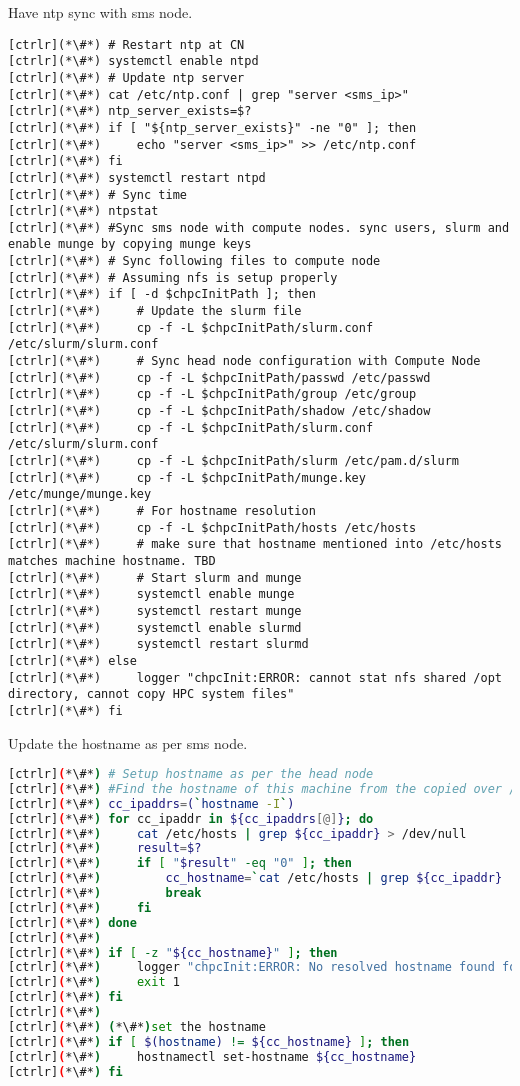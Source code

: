 Have ntp sync with sms node. 


\begin{lstlisting}
[ctrlr](*\#*) # Restart ntp at CN
[ctrlr](*\#*) systemctl enable ntpd
[ctrlr](*\#*) # Update ntp server
[ctrlr](*\#*) cat /etc/ntp.conf | grep "server <sms_ip>"
[ctrlr](*\#*) ntp_server_exists=$?
[ctrlr](*\#*) if [ "${ntp_server_exists}" -ne "0" ]; then
[ctrlr](*\#*)     echo "server <sms_ip>" >> /etc/ntp.conf
[ctrlr](*\#*) fi
[ctrlr](*\#*) systemctl restart ntpd
[ctrlr](*\#*) # Sync time
[ctrlr](*\#*) ntpstat
[ctrlr](*\#*) #Sync sms node with compute nodes. sync users, slurm and enable munge by copying munge keys
[ctrlr](*\#*) # Sync following files to compute node
[ctrlr](*\#*) # Assuming nfs is setup properly
[ctrlr](*\#*) if [ -d $chpcInitPath ]; then
[ctrlr](*\#*)     # Update the slurm file
[ctrlr](*\#*)     cp -f -L $chpcInitPath/slurm.conf /etc/slurm/slurm.conf
[ctrlr](*\#*)     # Sync head node configuration with Compute Node
[ctrlr](*\#*)     cp -f -L $chpcInitPath/passwd /etc/passwd
[ctrlr](*\#*)     cp -f -L $chpcInitPath/group /etc/group
[ctrlr](*\#*)     cp -f -L $chpcInitPath/shadow /etc/shadow
[ctrlr](*\#*)     cp -f -L $chpcInitPath/slurm.conf /etc/slurm/slurm.conf
[ctrlr](*\#*)     cp -f -L $chpcInitPath/slurm /etc/pam.d/slurm
[ctrlr](*\#*)     cp -f -L $chpcInitPath/munge.key /etc/munge/munge.key
[ctrlr](*\#*)     # For hostname resolution
[ctrlr](*\#*)     cp -f -L $chpcInitPath/hosts /etc/hosts
[ctrlr](*\#*)     # make sure that hostname mentioned into /etc/hosts matches machine hostname. TBD
[ctrlr](*\#*)     # Start slurm and munge 
[ctrlr](*\#*)     systemctl enable munge
[ctrlr](*\#*)     systemctl restart munge
[ctrlr](*\#*)     systemctl enable slurmd
[ctrlr](*\#*)     systemctl restart slurmd
[ctrlr](*\#*) else
[ctrlr](*\#*)     logger "chpcInit:ERROR: cannot stat nfs shared /opt directory, cannot copy HPC system files"
[ctrlr](*\#*) fi
\end{lstlisting}
Update the hostname as per sms node.


\begin{lstlisting}[language=bash,keywords={}]
[ctrlr](*\#*) # Setup hostname as per the head node
[ctrlr](*\#*) #Find the hostname of this machine from the copied over /etc/hosts file
[ctrlr](*\#*) cc_ipaddrs=(`hostname -I`)
[ctrlr](*\#*) for cc_ipaddr in ${cc_ipaddrs[@]}; do
[ctrlr](*\#*)     cat /etc/hosts | grep ${cc_ipaddr} > /dev/null
[ctrlr](*\#*)     result=$?
[ctrlr](*\#*)     if [ "$result" -eq "0" ]; then
[ctrlr](*\#*)         cc_hostname=`cat /etc/hosts | grep ${cc_ipaddr} | cut -d$'\t' -f2`
[ctrlr](*\#*)         break
[ctrlr](*\#*)     fi
[ctrlr](*\#*) done
[ctrlr](*\#*) 
[ctrlr](*\#*) if [ -z "${cc_hostname}" ]; then
[ctrlr](*\#*)     logger "chpcInit:ERROR: No resolved hostname found for any IP address in /etc/hosts"
[ctrlr](*\#*)     exit 1
[ctrlr](*\#*) fi
[ctrlr](*\#*) 
[ctrlr](*\#*) (*\#*)set the hostname
[ctrlr](*\#*) if [ $(hostname) != ${cc_hostname} ]; then
[ctrlr](*\#*)     hostnamectl set-hostname ${cc_hostname}
[ctrlr](*\#*) fi
\end{lstlisting}


